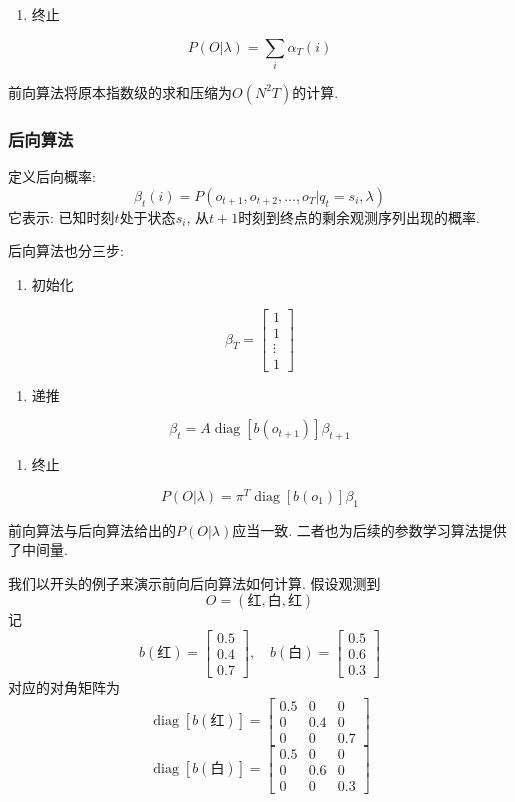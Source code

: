 \begin{enumerate}
\item[3.] 终止
\end{enumerate}
\[
P(O | \lambda) = \sum_i \alpha_T (i)
\]

前向算法将原本指数级的求和压缩为$O(N^2 T)$的计算.

\subsubsection{后向算法}


定义后向概率:
\[
\beta_t (i) = P(o_{t+1}, o_{t+2}, \dots, o_T | q_t = s_i, \lambda)
\]
它表示: 已知时刻$t$处于状态$s_i$, 从$t+1$时刻到终点的剩余观测序列出现的概率.

后向算法也分三步:

\begin{enumerate}
\item[1.] 初始化
\end{enumerate}
\[
\beta_T = \begin{bmatrix}1 \\ 1 \\ \vdots \\ 1\end{bmatrix}
\]

\begin{enumerate}
\item[2.] 递推
\end{enumerate}
\[
\beta_t = A \operatorname{diag}[b(o_{t+1})]\beta_{t+1}
\]

\begin{enumerate}
\item[3.] 终止
\end{enumerate}
\[
P(O | \lambda) = \pi^T \operatorname{diag}[b(o_1)]\beta_1
\]

前向算法与后向算法给出的$P(O | \lambda)$应当一致.
二者也为后续的参数学习算法提供了中间量.

我们以开头的例子来演示前向后向算法如何计算. 假设观测到
\[
O = (\text{红}, \text{白}, \text{红})
\]
记
\[
b(\text{红}) = \begin{bmatrix}0.5 \\ 0.4 \\ 0.7\end{bmatrix}, \quad b(\text{白}) = \begin{bmatrix}0.5 \\ 0.6 \\ 0.3\end{bmatrix}
\]
对应的对角矩阵为
\[
\operatorname{diag}[b(\text{红})] = \begin{bmatrix}0.5 & 0 & 0 \\ 0 & 0.4 & 0 \\ 0 & 0 & 0.7\end{bmatrix}
\]
\[
\operatorname{diag}[b(\text{白})] = \begin{bmatrix}0.5 & 0 & 0 \\ 0 & 0.6 & 0 \\ 0 & 0 & 0.3\end{bmatrix}
\]

